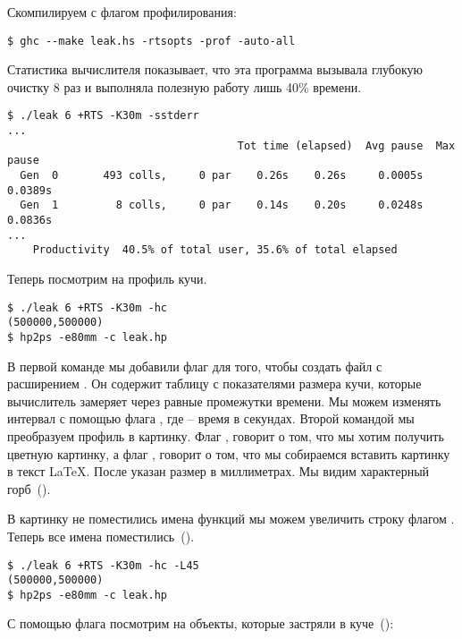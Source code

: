 Скомпилируем с флагом профилирования:


\begin{verbatim}
$ ghc --make leak.hs -rtsopts -prof -auto-all
\end{verbatim}

Статистика вычислителя показывает, что эта программа вызывала глубокую
очистку 8 раз и выполняла полезную работу лишь 40\% времени.


\begin{verbatim}
$ ./leak 6 +RTS -K30m -sstderr
...
                                    Tot time (elapsed)  Avg pause  Max pause
  Gen  0       493 colls,     0 par    0.26s    0.26s     0.0005s    0.0389s
  Gen  1         8 colls,     0 par    0.14s    0.20s     0.0248s    0.0836s
...
    Productivity  40.5% of total user, 35.6% of total elapsed

\end{verbatim}

Теперь посмотрим на профиль кучи.


\begin{verbatim}
$ ./leak 6 +RTS -K30m -hc
(500000,500000)
$ hp2ps -e80mm -c leak.hp
\end{verbatim}

В первой команде мы добавили флаг  для того, чтобы создать файл с
расширением . Он содержит таблицу с показателями размера кучи,
которые вычислитель замеряет через равные промежутки времени. Мы можем
изменять интервал с помощью флага , где  -- время в
секундах. Второй командой мы преобразуем профиль в картинку. Флаг
, говорит о том, что мы хотим получить цветную картинку, а флаг
, говорит о том, что мы собираемся вставить картинку в текст
LaTeX. После  указан размер в миллиметрах. Мы видим характерный
горб~().


В картинку не поместились имена функций мы можем увеличить строку флагом
. Теперь все имена поместились~().


\begin{verbatim}
$ ./leak 6 +RTS -K30m -hc -L45
(500000,500000)
$ hp2ps -e80mm -c leak.hp
\end{verbatim}


С помощью флага  посмотрим на объекты, которые застряли в
куче~():


